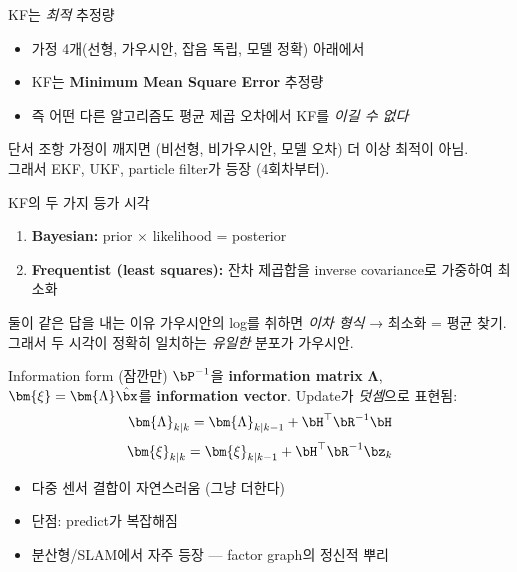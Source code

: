 \begin{frame}{KF는 \emph{최적} 추정량}
  \begin{itemize}
    \item 가정 4개(선형, 가우시안, 잡음 독립, 모델 정확) 아래에서
    \item KF는 \textbf{Minimum Mean Square Error} 추정량
    \item 즉 어떤 다른 알고리즘도 평균 제곱 오차에서 KF를 \emph{이길 수 없다}
  \end{itemize}
  \pause
  \vspace{0.3em}
  \begin{block}{단서 조항}
    가정이 깨지면 (비선형, 비가우시안, 모델 오차) 더 이상 최적이 아님. \\
    그래서 EKF, UKF, particle filter가 등장 (4회차부터).
  \end{block}
\end{frame}

\begin{frame}{KF의 두 가지 등가 시각}
  \footnotesize
  \begin{enumerate}
    \item \textbf{Bayesian:} prior $\times$ likelihood = posterior
    \item \textbf{Frequentist (least squares):} 잔차 제곱합을 inverse covariance로 가중하여 최소화
  \end{enumerate}
  \pause
  \vspace{0.4em}
  \begin{block}{둘이 같은 답을 내는 이유}
    가우시안의 log를 취하면 \emph{이차 형식} → 최소화 = 평균 찾기. \\
    그래서 두 시각이 정확히 일치하는 \emph{유일한} 분포가 가우시안.
  \end{block}
\end{frame}

\begin{frame}{Information form (잠깐만)}
  $\bP^{-1}$을 \textbf{information matrix} $\bm{\Lambda}$, $\bm{\xi} = \bm{\Lambda} \hat\bx$를 \textbf{information vector}.
  \pause
  \vspace{0.3em}
  Update가 \emph{덧셈}으로 표현됨:
  \[
    \bm{\Lambda}_{k|k} = \bm{\Lambda}_{k|k-1} + \bH^\top \bR^{-1} \bH
  \]
  \[
    \bm{\xi}_{k|k} = \bm{\xi}_{k|k-1} + \bH^\top \bR^{-1} \bz_k
  \]
  \pause
  \vspace{0.3em}
  \begin{itemize}
    \item 다중 센서 결합이 자연스러움 (그냥 더한다)
    \item 단점: predict가 복잡해짐
    \item 분산형/SLAM에서 자주 등장 — factor graph의 정신적 뿌리
  \end{itemize}
\end{frame}

